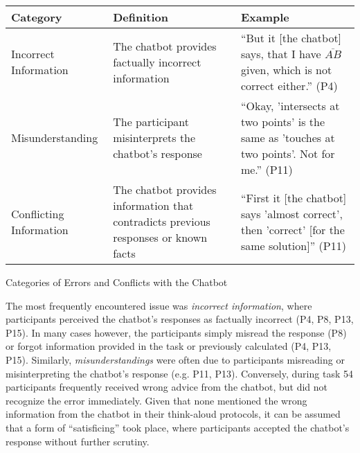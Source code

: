\begin{ctable}
    \begin{tabularx}{\textwidth}{l|X|X}
        \textbf{Category} & \textbf{Definition} & \textbf{Example} \\
        \hline
        Incorrect Information & The chatbot provides factually incorrect information & “But it [the chatbot] says, that I have $\overline{AB}$ given, which is not correct either.” (P4) \\
        Misunderstanding & The participant misinterprets the chatbot's response & “Okay, 'intersects at two points' is the same as 'touches at two points'. Not for me.” (P11) \\
        Conflicting Information & The chatbot provides information that contradicts previous responses or known facts & “First it [the chatbot] says 'almost correct', then 'correct' [for the same solution]” (P11) \\
    \end{tabularx}
    \caption{Categories of Errors and Conflicts with the Chatbot}
    \label{tab:conflicts_errors}
\end{ctable}

The most frequently encountered issue was \textit{incorrect information}, where participants perceived the chatbot's responses as factually incorrect (P4, P8, P13, P15). In many cases however, the participants simply misread the response (P8) or forgot information provided in the task or previously calculated (P4, P13, P15). Similarly, \textit{misunderstandings} were often due to participants misreading or misinterpreting the chatbot's response (e.g. P11, P13). Conversely, during task 54 participants frequently received wrong advice from the chatbot, but did not recognize the error immediately. Given that none mentioned the wrong information from the chatbot in their think-aloud protocols, it can be assumed that a form of “satisficing” \parencite{Simon1955} took place, where participants accepted the chatbot's response without further scrutiny.

